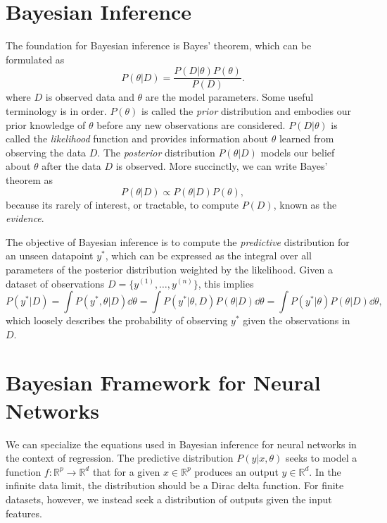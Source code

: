 
\section{Bayesian Inference}
The foundation for Bayesian inference is Bayes' theorem, which can be formulated as
\begin{equation}
	P(\theta | D) = \frac{P(D|\theta)P(\theta)}{P(D)}.
\end{equation}
where $D$ is observed data and $\theta$ are the model parameters.
Some useful terminology is in order. $P(\theta)$ is called the \textit{prior} distribution and embodies our prior knowledge of $\theta$ before any new observations are considered. $P(D|\theta)$ is called the \textit{likelihood} function and provides information about $\theta$ learned from observing the data $D$. The \textit{posterior} distribution $P(\theta|D)$ models our belief about $\theta$ after the data $D$ is observed. More succinctly, we can write Bayes' theorem as
\begin{equation}
  P(\theta|D) \propto P(\theta|D)P(\theta),
\end{equation}
because its rarely of interest, or tractable, to compute $P(D)$, known as the \textit{evidence}.

The objective of Bayesian inference is to compute the \textit{predictive} distribution for an unseen datapoint $y^*$, which can be expressed as
the integral over all parameters of the posterior distribution weighted by the likelihood. Given a dataset of observations $D = \{y^{(1)}, \ldots, y^{(n)}\}$, this implies
\begin{equation}
  P(y^*|D) = \int P(y^*, \theta|D)\dd\theta =\int P(y^*|\theta, D)P(\theta|D)\dd \theta = \int P(y^*|\theta)P(\theta|D)\dd\theta,
\end{equation}
which loosely describes the probability of observing $y^*$ given the observations in $D$.


\section{Bayesian Framework for Neural Networks}

We can specialize the equations used in Bayesian inference for neural networks in the context of regression.
The predictive distribution $P(y|x, \theta)$ seeks to model a function $f : \mathbb{R}^p \to \mathbb{R}^d$ that for a given $x \in \mathbb{R}^p$ produces an output $y \in \mathbb{R}^d$. In the infinite data limit, the distribution should be a Dirac delta function. For finite datasets, however, we instead seek a distribution of outputs given the input features.


